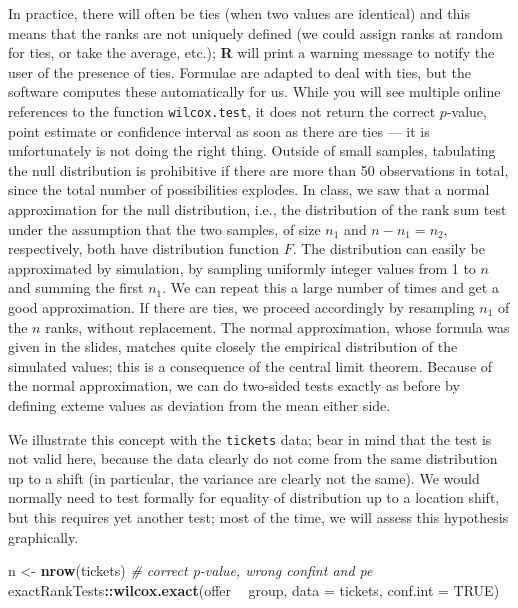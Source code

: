 \documentclass[
]{book}
\newenvironment{Shaded}{\begin{snugshade}}{\end{snugshade}}
\newcommand{\CommentTok}[1]{\textcolor[rgb]{0.56,0.35,0.01}{\textit{#1}}}
\newcommand{\DataTypeTok}[1]{\textcolor[rgb]{0.13,0.29,0.53}{#1}}
\newcommand{\KeywordTok}[1]{\textcolor[rgb]{0.13,0.29,0.53}{\textbf{#1}}}
\newcommand{\NormalTok}[1]{#1}
\newcommand{\OperatorTok}[1]{\textcolor[rgb]{0.81,0.36,0.00}{\textbf{#1}}}
\newcommand{\OtherTok}[1]{\textcolor[rgb]{0.56,0.35,0.01}{#1}}
\newcommand{\StringTok}[1]{\textcolor[rgb]{0.31,0.60,0.02}{#1}}
\begin{document}
In practice, there will often be ties (when two values are identical) and this means that the ranks are not uniquely defined (we could assign ranks at random for ties, or take the average, etc.); \textbf{R} will print a warning message to notify the user of the presence of ties. Formulae are adapted to deal with ties, but the software computes these automatically for us. While you will see multiple online references to the function \texttt{wilcox.test}, it does not return the correct \(p\)-value, point estimate or confidence interval as soon as there are ties --- it is unfortunately is not doing the right thing. Outside of small samples, tabulating the null distribution is prohibitive if there are more than 50 observations in total, since the total number of possibilities explodes. In class, we saw that a normal approximation for the null distribution, i.e., the distribution of the rank sum test under the assumption that the two samples, of size \(n_1\) and \(n-n_1=n_2\), respectively, both have distribution function \(F\). The distribution can easily be approximated by simulation, by sampling uniformly integer values from 1 to \(n\) and summing the first \(n_1\). We can repeat this a large number of times and get a good approximation. If there are ties, we proceed accordingly by resampling \(n_1\) of the \(n\) ranks, without replacement. The normal approximation, whose formula was given in the slides, matches quite closely the empirical distribution of the simulated values; this is a consequence of the central limit theorem. Because of the normal approximation, we can do two-sided tests exactly as before by defining exteme values as deviation from the mean either side.

We illustrate this concept with the \texttt{tickets} data; bear in mind that the test is not valid here, because the data clearly do not come from the same distribution up to a shift (in particular, the variance are clearly not the same). We would normally need to test formally for equality of distribution up to a location shift, but this requires yet another test; most of the time, we will assess this hypothesis graphically.

\begin{Shaded}
\begin{Highlighting}[]
\NormalTok{n <-}\StringTok{ }\KeywordTok{nrow}\NormalTok{(tickets)}
\CommentTok{# correct p-value, wrong confint and pe}
\NormalTok{exactRankTests}\OperatorTok{::}\KeywordTok{wilcox.exact}\NormalTok{(offer }\OperatorTok{~}\StringTok{ }\NormalTok{group, }\DataTypeTok{data =}\NormalTok{ tickets, }\DataTypeTok{conf.int =} \OtherTok{TRUE}\NormalTok{)}
\end{Highlighting}
\end{Shaded}
\end{document}
